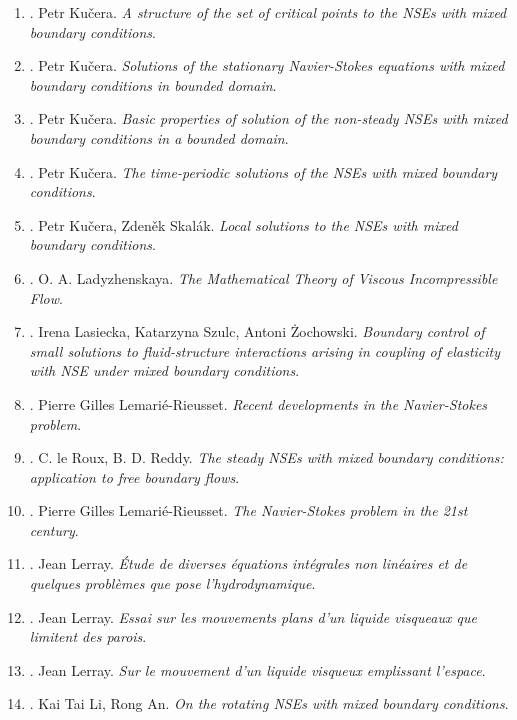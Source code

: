\documentclass{article}
\begin{document}
\begin{enumerate}
	\item \cite{Kucera1998a}. {\sc Petr Ku\v{c}era}. {\it A structure of the set of critical points to the NSEs with mixed boundary conditions}.
	\item \cite{Kucera1998b}. {\sc Petr Ku\v{c}era}. {\it Solutions of the stationary Navier-Stokes equations with mixed boundary conditions in bounded domain}.
	\item \cite{Kucera2009}. {\sc Petr Ku\v{c}era}. {\it Basic properties of solution of the non-steady NSEs with mixed boundary conditions in a bounded domain}.
	\item \cite{Kucera2010}. {\sc Petr Ku\v{c}era}. {\it The time-periodic solutions of the NSEs with mixed boundary conditions}.
	\item \cite{Kucera_Skalak1998}. {\sc Petr Ku\v{c}era, Zden\v{e}k Skal\'{a}k}. {\it Local solutions to the NSEs with mixed boundary conditions}.
	\item \cite{Ladyzhenskaya1969}. {\sc O. A. Ladyzhenskaya}. {\it The Mathematical Theory of Viscous Incompressible Flow}.
	\item \cite{Lasiecka_Szulc_Zochowski2018}. {\sc Irena Lasiecka, Katarzyna Szulc, Antoni \.{Z}ochowski}. {\it Boundary control of small solutions to fluid-structure interactions arising in coupling of elasticity with NSE under mixed boundary conditions}.
	\item \cite{Lemarie-Rieusset2002}. {\sc Pierre Gilles Lemari\'{e}-Rieusset}. {\it Recent developments in the Navier-Stokes problem}.
	\item \cite{le-Roux_Reddy1993}. {\sc C. le Roux, B. D. Reddy}. {\it The steady NSEs with mixed boundary conditions: application to free boundary flows}.
	\item \cite{Lemarie-Rieusset2016}. {\sc Pierre Gilles Lemari\'{e}-Rieusset}. {\it The Navier-Stokes problem in the 21st century}.
	\item \cite{Leray1933}. {\sc Jean Lerray}. {\it \'{E}tude de diverses \'{e}quations int\'{e}grales non lin\'{e}aires et de quelques probl\`emes que pose l'hydrodynamique}.
	\item \cite{Leray1934a}. {\sc Jean Lerray}. {\it Essai sur les mouvements plans d'un liquide visqueaux que limitent des parois}.
	\item \cite{Leray1934b}. {\sc Jean Lerray}. {\it Sur le mouvement d'un liquide visqueux emplissant l'espace}.
	\item \cite{Li_An2008}. {\sc Kai Tai Li, Rong An}. {\it On the rotating NSEs with mixed boundary conditions}.

\end{enumerate}
\end{document}
